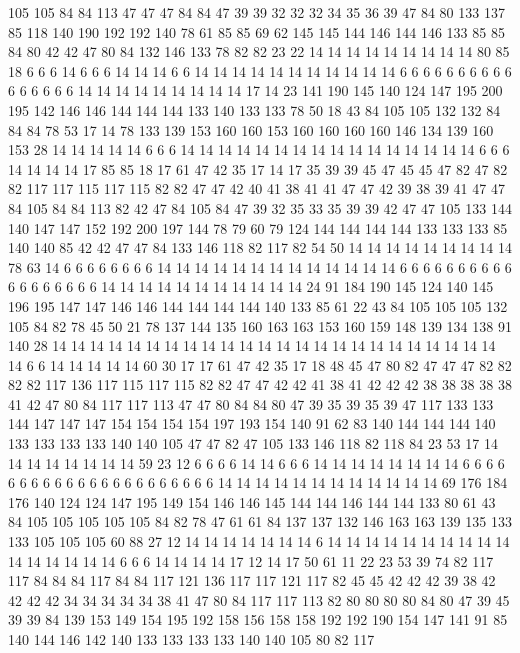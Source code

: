 105 105 84 84 113 47 47 47 84 84 47 39 39 32 32 32 34 35 36 39
47 84 80 133 137 85 118 140 190 192 192 140 78 61 85 85 69 62 145 145
144 146 144 146 133 85 85 84 80 42 42 47 80 84 132 146 133 78 82 82
23 22 14 14 14 14 14 14 14 14 14 80 85 18 6 6 6 14 6 6
6 14 14 14 6 6 14 14 14 14 14 14 14 14 14 14 14 6 6 6
6 6 6 6 6 6 6 6 6 6 6 6 6 14 14 14 14 14 14 14
14 14 17 14 23 141 190 145 140 124 147 195 200 195 142 146 146 144 144 144
133 140 133 133 78 50 18 43 84 105 105 132 132 84 84 84 78 53 17 14
78 133 139 153 160 160 153 160 160 160 160 146 134 139 160 153 28 14 14 14
14 14 6 6 6 14 14 14 14 14 14 14 14 14 14 14 14 14 14 14
14 6 6 6 14 14 14 14 17 85 85 18 17 61 47 42 35 17 14 17
35 39 39 45 47 45 45 47 82 47 82 82 117 117 115 117 115 82 82 47
47 42 40 41 38 41 41 47 47 42 39 38 39 41 47 47 84 105 84 84
113 82 42 47 84 105 84 47 39 32 35 33 35 39 39 42 47 47 105 133
144 140 147 147 152 192 200 197 144 78 79 60 79 124 144 144 144 144 133 133
133 85 140 140 85 42 42 47 47 84 133 146 118 82 117 82 54 50 14 14
14 14 14 14 14 14 14 78 63 14 6 6 6 6 6 6 6 6 14 14
14 14 14 14 14 14 14 14 14 14 14 6 6 6 6 6 6 6 6 6
6 6 6 6 6 6 6 6 6 14 14 14 14 14 14 14 14 14 14 14
24 91 184 190 145 124 140 145 196 195 147 147 146 146 144 144 144 144 140 133
85 61 22 43 84 105 105 105 132 105 84 82 78 45 50 21 78 137 144 135
160 163 163 153 160 159 148 139 134 138 91 140 28 14 14 14 14 14 14 14
14 14 14 14 14 14 14 14 14 14 14 14 14 14 14 14 14 14 6 6
14 14 14 14 14 60 30 17 17 61 47 42 35 17 18 48 45 47 80 82
47 47 47 82 82 82 82 117 136 117 115 117 115 82 82 47 47 42 42 41
38 41 42 42 42 38 38 38 38 38 41 42 47 80 84 117 117 113 47 47
80 84 84 80 47 39 35 39 35 39 47 117 133 133 144 147 147 147 154 154
154 154 197 193 154 140 91 62 83 140 144 144 144 140 133 133 133 133 140 140
105 47 47 82 47 105 133 146 118 82 118 84 23 53 17 14 14 14 14 14
14 14 14 59 23 12 6 6 6 6 14 14 6 6 6 14 14 14 14 14
14 14 14 6 6 6 6 6 6 6 6 6 6 6 6 6 6 6 6 6
6 6 6 6 6 14 14 14 14 14 14 14 14 14 14 14 14 69 176 184
176 140 124 124 147 195 149 154 146 146 145 144 144 146 144 144 133 80 61 43
84 105 105 105 105 105 84 82 78 47 61 61 84 137 137 132 146 163 163 139
135 133 133 105 105 105 60 88 27 12 14 14 14 14 14 14 14 6 14 14
14 14 14 14 14 14 14 14 14 14 14 14 14 14 6 6 6 14 14 14
14 17 12 14 17 50 61 11 22 23 53 39 74 82 117 117 84 84 84 117
84 84 117 121 136 117 117 121 117 82 45 45 42 42 42 39 38 42 42 42
42 34 34 34 34 34 38 41 47 80 84 117 117 113 82 80 80 80 80 84
80 47 39 45 39 39 84 139 153 149 154 195 192 158 156 158 158 192 192 190
154 147 141 91 85 140 144 146 142 140 133 133 133 133 140 140 105 80 82 117
